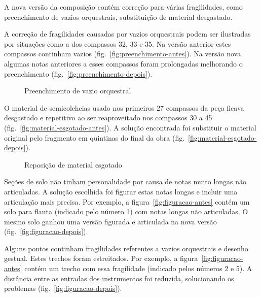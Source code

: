 \documentclass[10pt]{article}
\begin{document}
A nova versão da composição contém correção para várias fragilidades,
como preenchimento de vazios orquestrais, substituição de material
desgastado.

A correção de fragilidades causadas por vazios orquestrais podem ser
ilustradas por situações como a dos compassos 32, 33 e 35. Na versão
anterior estes compassos continham vazios
(fig.~\ref{fig:preenchimento-antes}). Na versão nova algumas notas
anteriores a esses compassos foram prolongadas melhorando o
preenchimento (fig.~\ref{fig:preenchimento-depois}).

\begin{figure*}
  \centering

  \caption{Preenchimento de vazio orquestral}
  \label{fig:preenchimento-vazio-orquestral}
\end{figure*}

O material de semicolcheias usado nos primeiros 27 compassos da peça
ficava desgastado e repetitivo ao ser reaproveitado nos compassos 30 a
45 (fig.~\ref{fig:material-esgotado-antes}). A solução encontrada foi
substituir o material original pelo fragmento em quintinas do final da
obra (fig.~\ref{fig:material-esgotado-depois}).

\begin{figure*}
  \centering

  \caption{Reposição de material esgotado}
  \label{fig:reposicao-material-esgotado}
\end{figure*}

Seções de solo não tinham personalidade por causa de notas muito
longas não articuladas. A solução escolhida foi figurar estas notas
longas e incluir uma articulação mais precisa. Por exemplo, a
figura~\ref{fig:figuracao-antes} contém um solo para flauta (indicado
pelo número 1) com notas longas não articuladas. O mesmo solo ganhou
uma versão figurada e articulada na nova versão
(fig.~\ref{fig:figuracao-depois}).

Alguns pontos continham fragilidades referentes a vazios orquestrais e
desenho gestual. Estes trechos foram estreitados. Por exemplo, a
figura~\ref{fig:figuracao-antes} contém um trecho com essa fragilidade
(indicado pelos números 2 e 5). A distância entre as entradas dos
instrumentos foi reduzida, solucionando os problemas
(fig.~\ref{fig:figuracao-depois}).
\end{document}
